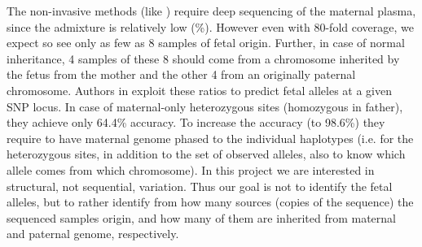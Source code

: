 The non-invasive methods (like \cite{kitzman2012, saunders2012, chu2009}) require deep sequencing of the maternal plasma, since the admixture is relatively low (\%). However even with 80-fold coverage, we expect so see only as few as 8 samples of fetal origin. Further, in case of normal inheritance, 4 samples of these 8 should come from a chromosome inherited by the fetus from the mother and the other 4 from an originally paternal chromosome. Authors in \cite{kitzman2012} exploit these ratios to predict fetal alleles at a given SNP locus. In case of maternal-only heterozygous sites (homozygous in father), they achieve only 64.4\% accuracy. To increase the accuracy (to 98.6\%) they require to have maternal genome phased to the individual haplotypes (i.e. for the heterozygous sites, in addition to the set of observed alleles, also to know which allele comes from which chromosome). In this project we are interested in structural, not sequential, variation. Thus our goal is not to identify the fetal alleles, but to rather identify from how many sources (copies of the sequence) the sequenced samples origin, and how many of them are inherited from maternal and paternal genome, respectively. 
